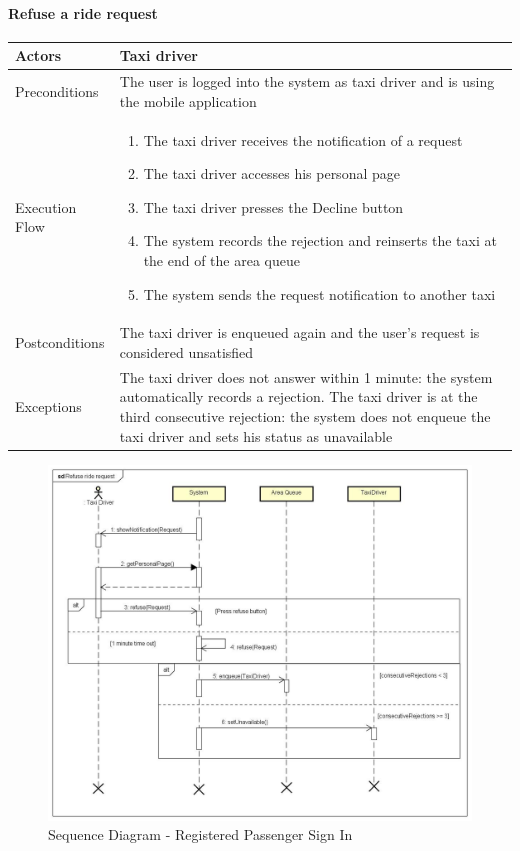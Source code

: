 \paragraph{Refuse a ride request}
\begin{center}
	\begin{tabular}{ | l | p{8cm} |}
		\hline Actors & Taxi driver
		\\ \hline
		Preconditions &
		The user is logged into the system as taxi driver and is using the mobile application
		\\ \hline
		Execution Flow &
		\begin{enumerate}
			\item The taxi driver receives the notification of a request
			\item The taxi driver accesses his personal page
			\item The taxi driver presses the Decline button
			\item The system records the rejection and reinserts the taxi at the end of
			the area queue
			\item The system sends the request notification to another taxi
		\end{enumerate}
		\\ \hline
		Postconditions & The taxi driver is enqueued again and the user's request
		is considered unsatisfied
		\\ \hline
		Exceptions &
		The taxi driver does not answer within 1 minute:
		the system automatically records a rejection.
		The taxi driver is at the third consecutive rejection:
		the system does not enqueue the taxi driver and sets his status as unavailable
		\\ \hline
	\end{tabular}
\end{center}
\newpage
\begin{landscape}
\begin{figure}[!h]
	\begin{center}			
		\includegraphics[height=\textheight]{../SE2_SD/RefuseRideRequest}
		\caption{Sequence Diagram - Registered Passenger Sign In}	
	\end{center}
\end{figure}
\end{landscape}
\newpage

